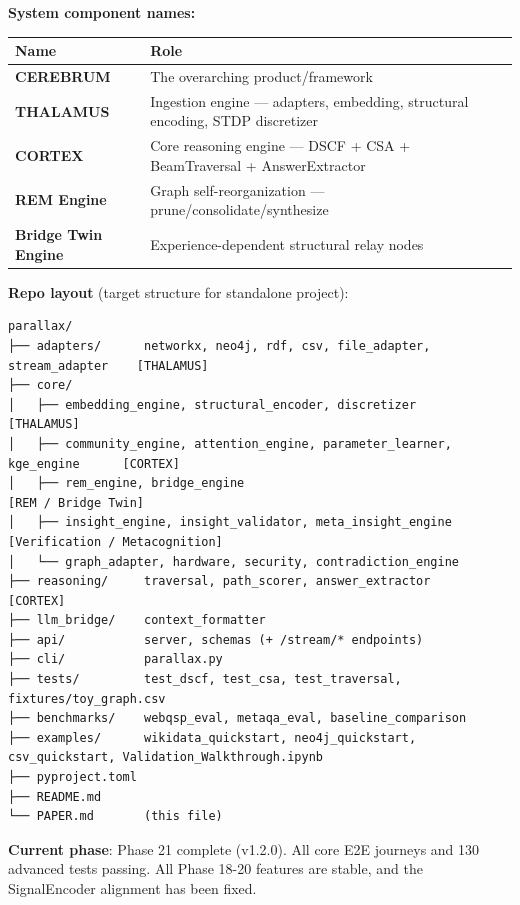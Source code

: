 \documentclass[10pt,journal,compsoc]{IEEEtran}
\begin{document}
\textbf{System component names:}

\begin{center}
\begin{tabularx}{\columnwidth}{|>{\raggedright\arraybackslash}X|>{\raggedright\arraybackslash}X|}
\hline
Name & Role \\ \hline
\textbf{CEREBRUM} & The overarching product/framework \\ \hline
\textbf{THALAMUS} & Ingestion engine — adapters, embedding, structural encoding, STDP discretizer \\ \hline
\textbf{CORTEX} & Core reasoning engine — DSCF + CSA + BeamTraversal + AnswerExtractor \\ \hline
\textbf{REM Engine} & Graph self-reorg\-anization — prune/consolidate/synthesize \\ \hline
\textbf{Bridge Twin Engine} & Experience-dependent structural relay nodes \\ \hline
\end{tabularx}
\end{center}

\textbf{Repo layout} (target structure for standalone project):

\begin{lstlisting}
parallax/
├── adapters/      networkx, neo4j, rdf, csv, file_adapter, stream_adapter    [THALAMUS]
├── core/
│   ├── embedding_engine, structural_encoder, discretizer                      [THALAMUS]
│   ├── community_engine, attention_engine, parameter_learner, kge_engine      [CORTEX]
│   ├── rem_engine, bridge_engine                                               [REM / Bridge Twin]
│   ├── insight_engine, insight_validator, meta_insight_engine                 [Verification / Metacognition]
│   └── graph_adapter, hardware, security, contradiction_engine
├── reasoning/     traversal, path_scorer, answer_extractor                    [CORTEX]
├── llm_bridge/    context_formatter
├── api/           server, schemas (+ /stream/* endpoints)
├── cli/           parallax.py
├── tests/         test_dscf, test_csa, test_traversal, fixtures/toy_graph.csv
├── benchmarks/    webqsp_eval, metaqa_eval, baseline_comparison
├── examples/      wikidata_quickstart, neo4j_quickstart, csv_quickstart, Validation_Walkthrough.ipynb
├── pyproject.toml
├── README.md
└── PAPER.md       (this file)
\end{lstlisting}

\textbf{Current phase}: Phase 21 complete (v1.2.0). All core E2E journeys and 130 advanced tests passing. All Phase 18-20 features are stable, and the SignalEncoder alignment has been fixed.
\end{document}
